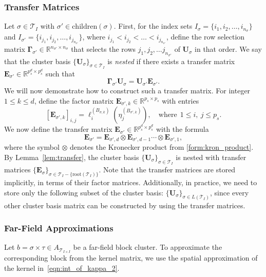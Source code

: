 \documentclass[final,3p,times]{elsarticle}
\newcommand{\mc}[1]{\mathcal{#1}}
\newcommand{\mat}[1]{\boldsymbol{#1}}
\newcommand{\R}{\mathbb{R}}
\begin{document}
 \subsubsection{Transfer Matrices}\label{sssec:Transfer_Matrices}
Let $\sigma \in \mc{T}_{I}$  with $\sigma' \in \text{children}(\sigma)$.  First, for the index sets $I_{\sigma} = \{i_1, i_2,\dots, i_{n_{\sigma}}\}$ and $I_{\sigma'} =\{i_{j_1}, i_{j_2}, \dots, i_{j_{n_{\sigma'}}} \}$, where $i_{j_1} < i_{j_2} < \dots < i_{j_{n_{\sigma'}}}$,  define the row selection matrix $\mat{\Gamma}_{\sigma'} \in \R^{n_{\sigma'} \times n_{\sigma}}$  that  selects the rows $j_1,  j_2, \dots j_{n_{\sigma'}}$ of $\mat{U}_{\sigma}$ in that order. We say that the cluster basis $\{\mat{U}_{\sigma} \}_{\sigma \in \mc{T}_{I}}$ is \emph{nested} if there exists a transfer matrix $\mat{E}_{\sigma'} \in \R^{p_s^{d} \times p_s^{d}}$ such that 
$$\mat{\Gamma}_{\sigma'}\mat{U}_{\sigma} = \mat{U}_{\sigma'}\mat{E}_{\sigma'}.$$
 We will now demonstrate how to construct such a transfer matrix. For integer $1 \le k \le d$, define the factor matrix $\mat{E}_{\sigma', k} \in \R^{p_s \times p_s}$ with  entries
$$ [\mat{E}_{\sigma', k}]_{i, j} = \ell_i^{(B_{\sigma, k})}(\eta^{(B_{\sigma', k})}_{j}),  \quad \text{where}~~ 1 \le i,~ j \le p_s.$$
We now define the transfer matrix $\mat{E}_{\sigma'} \in \R^{p_{s}^d \times p_{s}^d}$ with the formula
$$\mat{E}_{\sigma'} = \mat{E}_{\sigma', d} \otimes \mat{E}_{\sigma', d-1} \cdots \otimes \mat{E}_{\sigma', 1},$$
where the symbol $\otimes$ denotes the Kronecker product from \eqref{form:kron_product}. By Lemma~\ref{lem:transfer}, the cluster basis $\{\mat{U}_{\sigma}\}_{\sigma \in \mc{T}_{I}}$ is nested with transfer matrices $\{\mat{E}_{\sigma} \}_{\sigma \in \mc{T}_{I} - \{\text{root}(\mc{T}_{I})\}}$.
 Note that the transfer matrices are stored implicitly, in terms of their factor matrices. Additionally, in practice, we  need to store only the following subset of the cluster basis: $\{\mat{U}_{\sigma}\}_{\sigma \in L(\mc{T}_{I})}$, since every other cluster basis matrix can be constructed by using the transfer matrices.






\subsubsection{Far-Field Approximations}\label{sssec:Far_Field_Approximations}
Let $b = \sigma \times \tau \in  A_{\mc{T}_{ I \times I}}$ be a far-field block cluster. To approximate the corresponding block from the kernel matrix, we use the spatial approximation of the kernel in~\eqref{eqn:int_of_kappa_2}.
\end{document}
